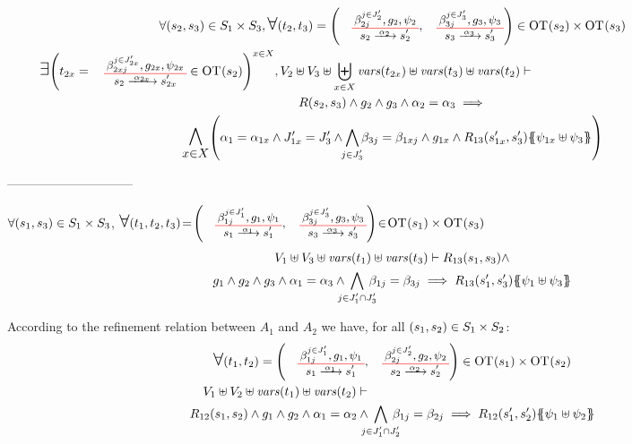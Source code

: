 \documentclass[runningheads]{llncs}
\begin{document}
\begin{enumerate}
\begin{multline*}
\forall \mpar{s_2, s_3} \in S_1 \times S_3, \bigsymb{\forall} \mpar{t_2, t_3} = \mpar{\OTx{2}{}{2}{2}, \OTx{3}{}{3}{3}} \in \fOT{s_2} \times \fOT{s_3} \\ 
\bigsymb{\bigexists} 
\mpar{t_{2x} = \OTx{2}{x}{2x}{2x} \in \fOT{s_2}}^{x \in X},
V_2 \uplus V_3\uplus \biguplus_{x\in X}\fvars{t_{2x}} \uplus \fvars{t_3} \uplus \fvars{t_2} \vdash \hspace{6cm}\\  R\mpar{s_2, s_3} \wedge 	g_2 \wedge g_3 \wedge \alpha_2 = \alpha_3 
\implies \\
\bigsymb{\bigwedge_{x\in X}}
\mpar{
\alpha_1=\alpha_{1 x}  \land J'_{1x}= J'_3 \land \bigwedge_\subbox{j \in J'_3 } \beta_{3j} = \beta_{1xj}\land g_{1 x}\land
 R_{13}\mpar{s'_{1 x}, s'_3}\psubst{\psi_{1 x} \uplus \psi_3}}\\
\end{multline*}



------------------------------



$\forall {\left(s_1,s_3\right)} \in S_1 \times S_3$, $\bigsymb{\forall} \mpar{t_1,t_2, t_{3}}\!=\! \mpar{\OTx{1}{}{1}{1},\OTx{3}{}{3}{3}}\! \in\! \fOT{s_1} \times \fOT{s_3}$
\begin{multline*}
V_1 \uplus V_3 \uplus \fvars{t_1}  \uplus \fvars{t_3} \vdash R_{13}\mpar{s_1, s_3} \wedge \\ g_1 \wedge g_{2} \wedge g_{3}
\wedge \alpha_1 = \alpha_{3}  \wedge \bigwedge_\subbox{j \in J'_1\cap  J'_{3}} \beta_{1j} = \beta_{3j}
 \implies R_{13}\mpar{s'_1, s'_3} \psubst{\psi_1 \uplus \psi_3 } 
\end{multline*}


According to the refinement relation between  $A_1$ and $A_2$ we have, for all ${\left(s_1,s_{2}\right)} \in S_1 \times S_2$:
\begin{multline*}
\bigsymb{\forall} \mpar{t_1, t_{2}} = \mpar{\OTx{1}{}{1}{1}, \OTx{2}{}{2}{2}} \in \fOT{s_1} \times \fOT{s_2} \\  V_1 \uplus V_2 \uplus \fvars{t_1} \uplus \fvars{t_2} \vdash \hspace{6cm}\\  R_{12}\mpar{s_1, s_2} \wedge 	g_1 \wedge g_{2} \wedge \alpha_1 = \alpha_{2} \wedge \bigwedge_\subbox{j \in J'_1 \cap J'_{2}} \beta_{1j} = \beta_{2j} \implies  R_{12}\mpar{s'_1, s'_{2}}\psubst{\psi_1 \uplus \psi_2}
\end{multline*}


\end{enumerate}
\end{document}
